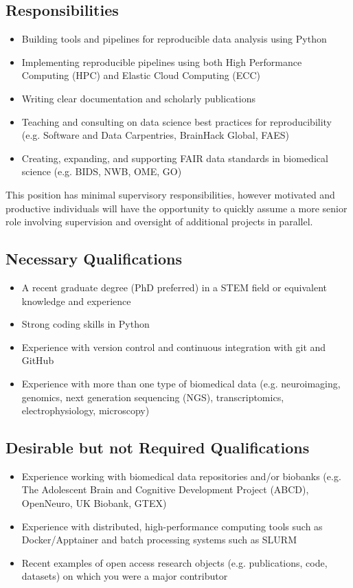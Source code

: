 \documentclass[11pt,letterpaper]{article}
\begin{document}
\begin{multicols}{2}
\subsection*{Responsibilities}
\begin{itemize}[leftmargin=*, noitemsep, topsep=0pt]
    \item Building tools and pipelines for reproducible data analysis using Python
    \item Implementing reproducible pipelines using both High Performance Computing (HPC) and Elastic Cloud Computing (ECC)
    \item Writing clear documentation and scholarly publications
    \item Teaching and consulting on data science best practices for reproducibility (e.g. Software and Data Carpentries, BrainHack Global, FAES)
    \item Creating, expanding, and supporting FAIR data standards in biomedical science (e.g. BIDS, NWB, OME, GO)
\end{itemize}

This position has minimal supervisory responsibilities, however motivated and productive individuals will have the opportunity to quickly assume a more senior role involving supervision and oversight of additional projects in parallel.

\subsection*{Necessary Qualifications}
\begin{itemize}[leftmargin=*, noitemsep, topsep=0pt]
    \item A recent graduate degree (PhD preferred) in a STEM field or equivalent knowledge and experience
    \item Strong coding skills in Python
    \item Experience with version control and continuous integration with git and GitHub
    \item Experience with more than one type of biomedical data (e.g. neuroimaging, genomics, next generation sequencing (NGS), transcriptomics, electrophysiology, microscopy)
\end{itemize}

\subsection*{Desirable but not Required Qualifications}
\begin{itemize}[leftmargin=*, noitemsep, topsep=0pt]
    \item Experience working with biomedical data repositories and/or biobanks (e.g. The Adolescent Brain and Cognitive Development Project (ABCD), OpenNeuro, UK Biobank, GTEX)
    \item Experience with distributed, high-performance computing tools such as Docker/Apptainer and batch processing systems such as SLURM
    \item Recent examples of open access research objects (e.g. publications, code, datasets) on which you were a major contributor
\end{itemize}


\end{multicols}
\end{document}
